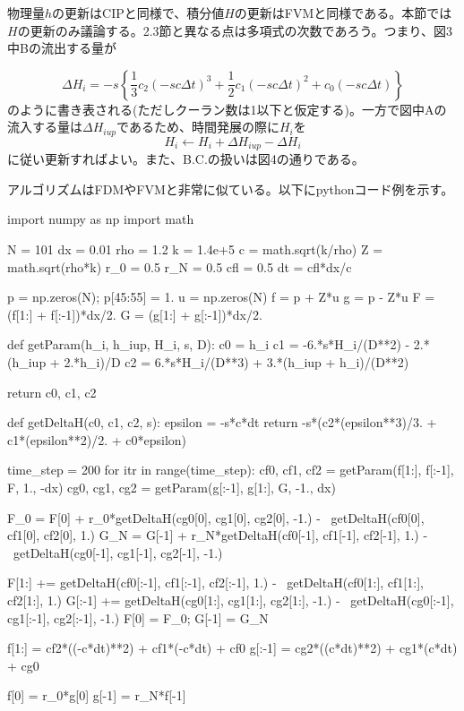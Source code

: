 \documentclass[dvipdfmx, 9pt, a4paper]{jsarticle}
\begin{document}
物理量$h$の更新はCIPと同様で、積分値$H$の更新はFVMと同様である。本節では$H$の更新のみ議論する。2.3節と異なる点は多項式の次数であろう。つまり、図3中Bの流出する量が

\begin{equation}
\Delta H_i = -s\left\{\frac{1}{3}c_2(-sc\Delta t)^3 + \frac{1}{2}c_1(-sc\Delta t)^2 + c_0(-sc\Delta t) \right\}
\end{equation}
のように書き表される(ただしクーラン数は1以下と仮定する)。一方で図中Aの流入する量は$\Delta H_{iup}$であるため、時間発展の際に$H_i$を
\begin{equation}
H_i \leftarrow H_i + \Delta H_{iup} - \Delta H_i
\end{equation}
に従い更新すればよい。また、B.C.の扱いは図4の通りである。\par
アルゴリズムはFDMやFVMと非常に似ている。以下にpythonコード例を示す。

\begin{python}
import numpy as np
import math

N = 101
dx = 0.01
rho = 1.2
k = 1.4e+5
c = math.sqrt(k/rho)
Z = math.sqrt(rho*k)
r_0 = 0.5
r_N = 0.5
cfl = 0.5
dt = cfl*dx/c

p = np.zeros(N); p[45:55] = 1.
u = np.zeros(N)
f = p + Z*u
g = p - Z*u
F = (f[1:] + f[:-1])*dx/2.
G = (g[1:] + g[:-1])*dx/2.


def getParam(h_i, h_iup, H_i, s, D):
	c0 = h_i
	c1 = -6.*s*H_i/(D**2) - 2.*(h_iup + 2.*h_i)/D
	c2 = 6.*s*H_i/(D**3) + 3.*(h_iup + h_i)/(D**2)

	return c0, c1, c2

def getDeltaH(c0, c1, c2, s):
	epsilon = -s*c*dt
	return -s*(c2*(epsilon**3)/3. + c1*(epsilon**2)/2. + c0*epsilon)

time_step = 200
for itr in range(time_step):
	cf0, cf1, cf2 = getParam(f[1:], f[:-1], F, 1., -dx)
	cg0, cg1, cg2 = getParam(g[:-1], g[1:], G, -1., dx)

	F_0 = F[0] + r_0*getDeltaH(cg0[0], cg1[0], cg2[0], -1.) - \
		getDeltaH(cf0[0], cf1[0], cf2[0], 1.)
	G_N = G[-1] + r_N*getDeltaH(cf0[-1], cf1[-1], cf2[-1], 1.) - \
		getDeltaH(cg0[-1], cg1[-1], cg2[-1], -1.)

	F[1:] += getDeltaH(cf0[:-1], cf1[:-1], cf2[:-1], 1.) - \
		getDeltaH(cf0[1:], cf1[1:], cf2[1:], 1.)
	G[:-1] += getDeltaH(cg0[1:], cg1[1:], cg2[1:], -1.) - \
		getDeltaH(cg0[:-1], cg1[:-1], cg2[:-1], -1.)
	F[0] = F_0; G[-1] = G_N

	f[1:] = cf2*((-c*dt)**2) + cf1*(-c*dt) + cf0
	g[:-1] = cg2*((c*dt)**2) + cg1*(c*dt) + cg0

	f[0] = r_0*g[0]
	g[-1] = r_N*f[-1]

\end{python}
\end{document}
